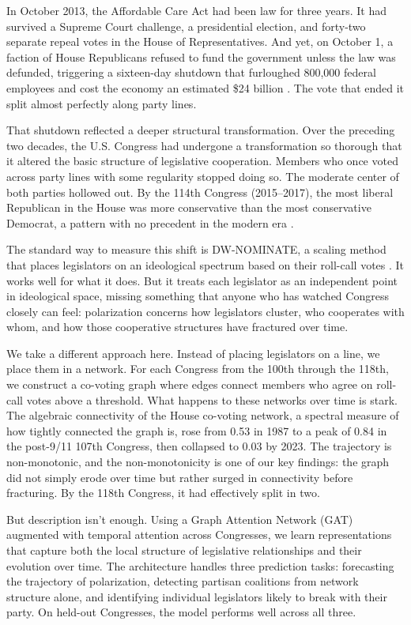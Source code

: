 \documentclass[12pt, a4paper]{article}
\begin{document}
In October 2013, the Affordable Care Act had been law for three years. It had survived a Supreme Court challenge, a presidential election, and forty-two separate repeal votes in the House of Representatives. And yet, on October 1, a faction of House Republicans refused to fund the government unless the law was defunded, triggering a sixteen-day shutdown that furloughed 800,000 federal employees and cost the economy an estimated \$24 billion \citep{cbo2013}. The vote that ended it split almost perfectly along party lines.

That shutdown reflected a deeper structural transformation. Over the preceding two decades, the U.S. Congress had undergone a transformation so thorough that it altered the basic structure of legislative cooperation. Members who once voted across party lines with some regularity stopped doing so. The moderate center of both parties hollowed out. By the 114th Congress (2015--2017), the most liberal Republican in the House was more conservative than the most conservative Democrat, a pattern with no precedent in the modern era \citep{poole2017}.

The standard way to measure this shift is DW-NOMINATE, a scaling method that places legislators on an ideological spectrum based on their roll-call votes \citep{poole1985}. It works well for what it does. But it treats each legislator as an independent point in ideological space, missing something that anyone who has watched Congress closely can feel: polarization concerns how legislators cluster, who cooperates with whom, and how those cooperative structures have fractured over time.

We take a different approach here. Instead of placing legislators on a line, we place them in a network. For each Congress from the 100th through the 118th, we construct a co-voting graph where edges connect members who agree on roll-call votes above a threshold. What happens to these networks over time is stark. The algebraic connectivity of the House co-voting network, a spectral measure of how tightly connected the graph is, rose from 0.53 in 1987 to a peak of 0.84 in the post-9/11 107th Congress, then collapsed to 0.03 by 2023. The trajectory is non-monotonic, and the non-monotonicity is one of our key findings: the graph did not simply erode over time but rather surged in connectivity before fracturing. By the 118th Congress, it had effectively split in two.

But description isn't enough. Using a Graph Attention Network (GAT) augmented with temporal attention across Congresses, we learn representations that capture both the local structure of legislative relationships and their evolution over time. The architecture handles three prediction tasks: forecasting the trajectory of polarization, detecting partisan coalitions from network structure alone, and identifying individual legislators likely to break with their party. On held-out Congresses, the model performs well across all three.
\end{document}
